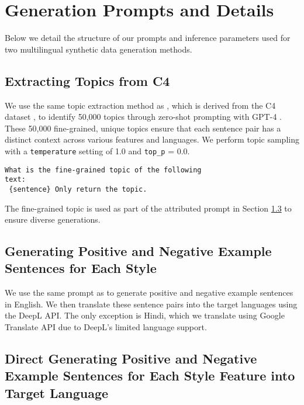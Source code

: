 \section{Generation Prompts and Details}
\label{sec:appendix:generationdetails}

Below we detail the structure of our prompts and inference parameters used for two multilingual synthetic data generation methods.

\subsection{Extracting Topics from C4}
\label{sec:extracttopic}

We use the same topic extraction method as \citet{patel2024styledistancestrongercontentindependentstyle}, which is derived from the C4 dataset \citep{t5andc4}, to identify 50,000 topics through zero-shot prompting with GPT-4 \citep{gpt4}. These 50,000 fine-grained, unique topics ensure that each sentence pair has a distinct context across various features and languages. We perform topic sampling with a \texttt{temperature} setting of 1.0 and \texttt{top\_p} = 0.0.

\vspace{1em}
{\small
\begin{verbatim}
What is the fine-grained topic of the following 
text: 
 {sentence} Only return the topic. 
\end{verbatim}}
\vspace{1em}

\noindent The fine-grained topic is used as part of the attributed prompt in Section \ref{sec:genposandneg} to ensure diverse generations.

\subsection{Generating Positive and Negative Example Sentences for Each Style} 

We use the same prompt as \citet{patel2024styledistancestrongercontentindependentstyle} to generate positive and negative example sentences in English. We then translate these sentence pairs into the target languages using the DeepL API. The only exception is Hindi, which we translate using Google Translate API due to DeepL's limited language support.

\subsection{Direct Generating Positive and Negative Example Sentences for Each Style Feature into Target Language}
\label{sec:genposandneg}


